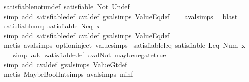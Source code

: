 \begin{isabellebody}
\isamarkupfalse%
\ satisfiable{\isacharunderscore}not{\isacharunderscore}undef{\isacharcolon}\ {\isachardoublequoteopen}satisfiable\ {\isacharparenleft}Not\ {\isacharparenleft}Undef{\isacharparenright}{\isacharparenright}{\isachardoublequoteclose}\isanewline
%
\isadelimproof
\ \ %
\endisadelimproof
%
\isatagproof
{}\isamarkupfalse%
\ {\isacharparenleft}simp\ add{\isacharcolon}\ satisfiable{\isacharunderscore}def\ cval{\isacharunderscore}def\ gval{\isachardot}simps\ ValueEq{\isacharunderscore}def{\isacharparenright}\isanewline
\ \ \isamarkupfalse%
\ aval{\isachardot}simps{\isacharparenleft}{}{\isacharparenright}\ \isamarkupfalse%
\ blast%
\endisatagproof
{\isafoldproof}%
%
\isadelimproof
\isanewline
%
\endisadelimproof
\isanewline
{}\isamarkupfalse%
\ satisfiable{\isacharunderscore}neq{\isacharcolon}\ {\isachardoublequoteopen}satisfiable\ {\isacharparenleft}Neq\ x{}{\isacharparenright}{\isachardoublequoteclose}\isanewline
%
\isadelimproof
\ \ %
\endisadelimproof
%
\isatagproof
{}\isamarkupfalse%
\ {\isacharparenleft}simp\ add{\isacharcolon}\ satisfiable{\isacharunderscore}def\ cval{\isacharunderscore}def\ gval{\isachardot}simps\ ValueEq{\isacharunderscore}def{\isacharparenright}\isanewline
\ \ \isamarkupfalse%
\ {\isacharparenleft}metis\ aval{\isachardot}simps{\isacharparenleft}{}{\isacharparenright}\ option{\isachardot}inject\ value{\isachardot}simps{\isacharparenleft}{}{\isacharparenright}{\isacharparenright}%
\endisatagproof
{\isafoldproof}%
%
\isadelimproof
\isanewline
%
\endisadelimproof
\isanewline
{}\isamarkupfalse%
\ satisfiable{\isacharunderscore}leq{\isacharcolon}\ {\isachardoublequoteopen}satisfiable\ {\isacharparenleft}Leq\ {\isacharparenleft}Num\ x{\isacharparenright}{\isacharparenright}{\isachardoublequoteclose}\isanewline
%
\isadelimproof
\ \ %
\endisadelimproof
%
\isatagproof
{}\isamarkupfalse%
\ {\isacharparenleft}simp\ add{\isacharcolon}\ satisfiable{\isacharunderscore}def\ cval{\isacharunderscore}Not\ maybe{\isacharunderscore}negate{\isacharunderscore}true{\isacharparenright}\isanewline
\ \ \isamarkupfalse%
\ {\isacharparenleft}simp\ add{\isacharcolon}\ cval{\isacharunderscore}def\ gval{\isachardot}simps\ ValueGt{\isacharunderscore}def{\isacharparenright}\isanewline
\ \ \isamarkupfalse%
\ {\isacharparenleft}metis\ MaybeBoolInt{\isachardot}simps{\isacharparenleft}{}{\isacharparenright}\ aval{\isachardot}simps{\isacharparenleft}{}{\isacharparenright}\ minf{\isacharparenleft}{}{\isacharparenright}{\isacharparenright}%

\end{isabellebody}
